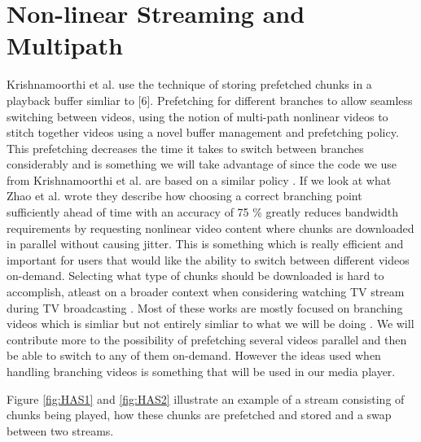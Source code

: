 \section{Non-linear Streaming and Multipath}
\label{sec:nonlinear}

Krishnamoorthi et al. \cite{hasmultipath} use the technique of storing prefetched chunks in a playback buffer simliar to [6]. Prefetching for different branches to allow seamless switching between videos, using the notion of multi-path nonlinear videos to stitch together videos using a novel buffer management and prefetching policy. This prefetching decreases the time it takes to switch between branches considerably and is something we will take advantage of since the code we use from Krishnamoorthi et al.\cite{qualbranch} are based on a similar policy \cite{hasmultipath}. If we look at what Zhao et al. \cite{scalableOnDemand} wrote they describe how choosing a correct branching point sufficiently ahead of time with an accuracy of 75 \% greatly reduces bandwidth requirements by requesting nonlinear video content where chunks are downloaded in parallel without causing jitter. This is something which is really efficient and important for users that would like the ability to switch between different videos on-demand. Selecting what type of chunks should be downloaded is hard to accomplish, atleast on a broader context when considering watching TV stream during TV broadcasting \cite{scalableOnDemand}. Most of these works are mostly focused on branching videos which is simliar but not entirely simliar to what we will be doing \cite{qualbranch, hasmultipath,scalableOnDemand}. We will contribute more to the possibility of prefetching several videos parallel and then be able to switch to any of  them on-demand. However the ideas used when handling branching videos is something that will be used in our media player.

Figure \ref{fig:HAS1} and \ref{fig:HAS2} illustrate an example of a stream consisting of chunks being played, how these chunks are prefetched and stored and a swap between two streams.

